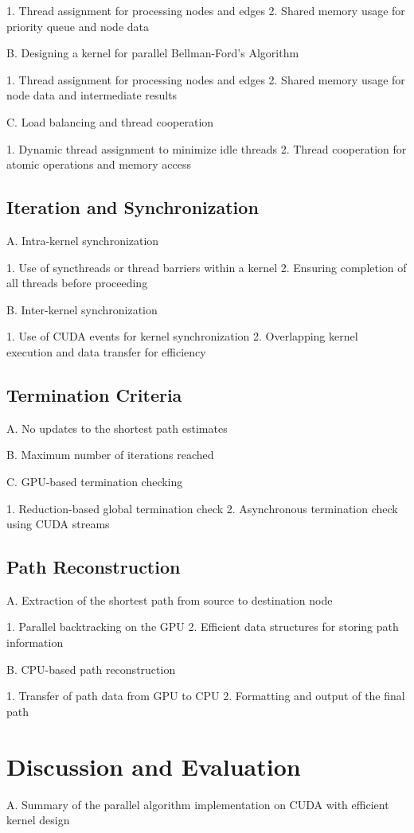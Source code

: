 \documentclass{article}
\begin{document}
1. Thread assignment for processing nodes and edges
2. Shared memory usage for priority queue and node data

B. Designing a kernel for parallel Bellman-Ford's Algorithm

1. Thread assignment for processing nodes and edges
2. Shared memory usage for node data and intermediate results

C. Load balancing and thread cooperation

1. Dynamic thread assignment to minimize idle threads
2. Thread cooperation for atomic operations and memory access

\subsection{Iteration and Synchronization}
A. Intra-kernel synchronization

1. Use of syncthreads or thread barriers within a kernel
2. Ensuring completion of all threads before proceeding

B. Inter-kernel synchronization

1. Use of CUDA events for kernel synchronization
2. Overlapping kernel execution and data transfer for efficiency

\subsection{Termination Criteria}
A. No updates to the shortest path estimates

B. Maximum number of iterations reached

C. GPU-based termination checking

1. Reduction-based global termination check
2. Asynchronous termination check using CUDA streams

\subsection{Path Reconstruction}
A. Extraction of the shortest path from source to destination node

1. Parallel backtracking on the GPU
2. Efficient data structures for storing path information

B. CPU-based path reconstruction

1. Transfer of path data from GPU to CPU
2. Formatting and output of the final path



\section{Discussion and Evaluation}
A. Summary of the parallel algorithm implementation on CUDA with efficient kernel design
\end{document}
